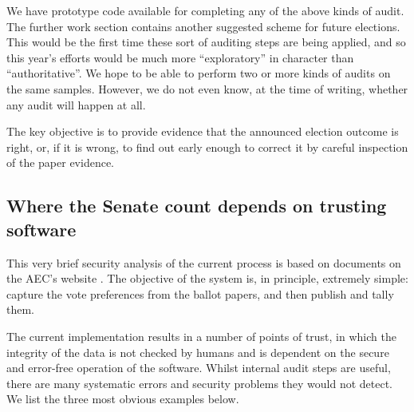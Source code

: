 \documentclass[10pt,a4paper]{article}
\newcommand{\longVersion}[1]{#1}
\newcommand{\longVersion}[1]{}
\begin{document}
We have prototype code available for completing any of the above kinds of audit.  
\longVersion{The further work section contains another suggested scheme for future elections.}
This would be the first time these sort of auditing steps are being applied, and so this year's efforts would be much more ``exploratory'' in character than ``authoritative''.  We hope to be able to perform two or more kinds of audits on the same samples.  However, we do not even know, at the time of writing, whether any audit will happen at all.  

The key objective is to provide evidence that the announced election outcome is right, or, if it is wrong, to find out early enough to correct it by careful inspection of the paper evidence.

\subsection{Where the Senate count depends on trusting software}
This very brief security analysis of the current process is based on documents on the AEC's website  \cite{AECSenateDesign}.
The objective of the system is, in principle, extremely simple:
capture the vote preferences from the ballot papers, and then publish
and tally them. 

The current implementation results in a number of points of trust, in which the integrity of the data is not checked by humans and is dependent on the secure and error-free operation of the software. Whilst internal audit steps are useful, there are many systematic errors and security problems they would not detect.  We list the three most obvious examples below. 
\end{document}
